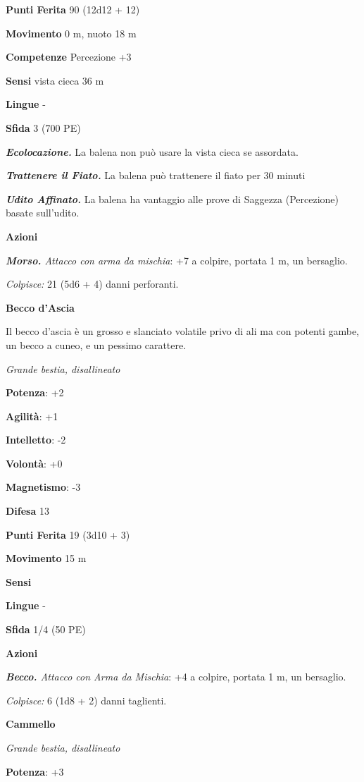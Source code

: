 \begin{multicols}{2}
\textbf{Punti Ferita} 90 (12d12 + 12)

\textbf{Movimento} 0 m, nuoto 18 m

\textbf{Competenze} Percezione +3

\textbf{Sensi} vista cieca 36 m

\textbf{Lingue} -

\textbf{Sfida} 3 (700 PE)\smallskip

\emph{\textbf{Ecolocazione.}} La balena non può usare la vista cieca se
assordata.

\emph{\textbf{Trattenere il Fiato.}} La balena può trattenere il fiato
per 30 minuti

\emph{\textbf{Udito Affinato.}} La balena ha vantaggio alle prove di
Saggezza (Percezione) basate sull'udito.

\smallskip\textbf{Azioni}

\emph{\textbf{Morso.} Attacco con arma da mischia}: +7 a colpire,
portata 1 m, un bersaglio.

\emph{Colpisce:} 21 (5d6 + 4) danni perforanti.

\textbf{Becco d'Ascia}

Il becco d'ascia è un grosso e slanciato volatile privo di ali ma con
potenti gambe, un becco a cuneo, e un pessimo carattere.

\emph{Grande bestia, disallineato}

\textbf{Potenza}: +2

\textbf{Agilità}: +1

\textbf{Intelletto}: -2

\textbf{Volontà}: +0

\textbf{Magnetismo}: -3

\textbf{Difesa} 13

\textbf{Punti Ferita} 19 (3d10 + 3)

\textbf{Movimento} 15 m

\textbf{Sensi} 

\textbf{Lingue} -

\textbf{Sfida} 1/4 (50 PE)\smallskip

\smallskip\textbf{Azioni}

\emph{\textbf{Becco.} Attacco con Arma da Mischia}: +4 a colpire,
portata 1 m, un bersaglio.

\emph{Colpisce:} 6 (1d8 + 2) danni taglienti.

\textbf{Cammello}

\emph{Grande bestia, disallineato}

\textbf{Potenza}: +3


\end{multicols}
